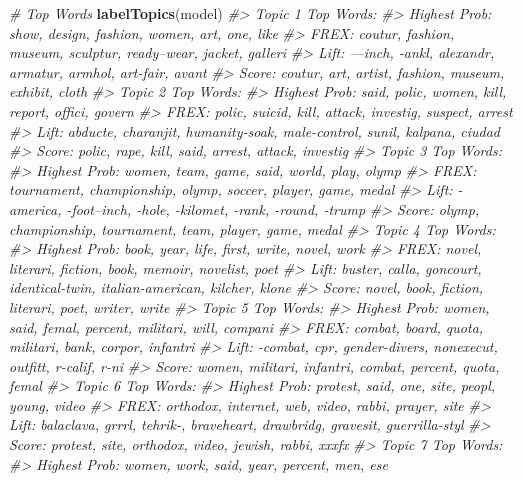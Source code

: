 \documentclass[]{book}
\newenvironment{Shaded}{\begin{snugshade}}{\end{snugshade}}
\newcommand{\KeywordTok}[1]{\textcolor[rgb]{0.13,0.29,0.53}{\textbf{#1}}}
\newcommand{\CommentTok}[1]{\textcolor[rgb]{0.56,0.35,0.01}{\textit{#1}}}
\newcommand{\NormalTok}[1]{#1}
\begin{document}
\begin{Shaded}
\begin{Highlighting}[]
\CommentTok{# Top Words}
\KeywordTok{labelTopics}\NormalTok{(model)}
\CommentTok{#> Topic 1 Top Words:}
\CommentTok{#>       Highest Prob: show, design, fashion, women, art, one, like }
\CommentTok{#>       FREX: coutur, fashion, museum, sculptur, ready--wear, jacket, galleri }
\CommentTok{#>       Lift: ---inch, -ankl, alexandr, armatur, armhol, art-fair, avant }
\CommentTok{#>       Score: coutur, art, artist, fashion, museum, exhibit, cloth }
\CommentTok{#> Topic 2 Top Words:}
\CommentTok{#>       Highest Prob: said, polic, women, kill, report, offici, govern }
\CommentTok{#>       FREX: polic, suicid, kill, attack, investig, suspect, arrest }
\CommentTok{#>       Lift: abducte, charanjit, humanity-soak, male-control, sunil, kalpana, ciudad }
\CommentTok{#>       Score: polic, rape, kill, said, arrest, attack, investig }
\CommentTok{#> Topic 3 Top Words:}
\CommentTok{#>       Highest Prob: women, team, game, said, world, play, olymp }
\CommentTok{#>       FREX: tournament, championship, olymp, soccer, player, game, medal }
\CommentTok{#>       Lift: -america, -foot--inch, -hole, -kilomet, -rank, -round, -trump }
\CommentTok{#>       Score: olymp, championship, tournament, team, player, game, medal }
\CommentTok{#> Topic 4 Top Words:}
\CommentTok{#>       Highest Prob: book, year, life, first, write, novel, work }
\CommentTok{#>       FREX: novel, literari, fiction, book, memoir, novelist, poet }
\CommentTok{#>       Lift: buster, calla, goncourt, identical-twin, italian-american, kilcher, klone }
\CommentTok{#>       Score: novel, book, fiction, literari, poet, writer, write }
\CommentTok{#> Topic 5 Top Words:}
\CommentTok{#>       Highest Prob: women, said, femal, percent, militari, will, compani }
\CommentTok{#>       FREX: combat, board, quota, militari, bank, corpor, infantri }
\CommentTok{#>       Lift: -combat, cpr, gender-divers, nonexecut, outfitt, r-calif, r-ni }
\CommentTok{#>       Score: women, militari, infantri, combat, percent, quota, femal }
\CommentTok{#> Topic 6 Top Words:}
\CommentTok{#>       Highest Prob: protest, said, one, site, peopl, young, video }
\CommentTok{#>       FREX: orthodox, internet, web, video, rabbi, prayer, site }
\CommentTok{#>       Lift: balaclava, grrrl, tehrik-, braveheart, drawbridg, gravesit, guerrilla-styl }
\CommentTok{#>       Score: protest, site, orthodox, video, jewish, rabbi, xxxfx }
\CommentTok{#> Topic 7 Top Words:}
\CommentTok{#>       Highest Prob: women, work, said, year, percent, men, ese }

\end{Highlighting}
\end{Shaded}
\end{document}

